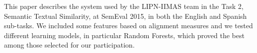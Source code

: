 This paper describes the system used by the LIPN-IIMAS team in the Task 2, Semantic Textual Similarity, at SemEval 2015, in both the English and Spanish sub-tasks. We included some features based on alignment measures and we tested different learning models, in particular Random Forests, which proved the best among those selected for our participation.
